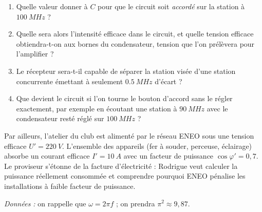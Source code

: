 \documentclass[11pt]{article}
\newcounter{popsec}
\newcounter{popsub}
\newcommand{\courssub}[1]{%
  \stepcounter{popsub}%
  \par\vspace{9pt}\noindent{\popxbold\fontsize{11.5}{13}\selectfont\color{popink}{\color{poporange}\thepopsec.\thepopsub}\hspace{6pt}#1}\par\nopagebreak\vspace{4pt}
}
\begin{document}
\begin{enumerate}
\item Quelle valeur donner à $C$ pour que le circuit soit \emph{accordé} sur la station à $\SI{100}{MHz}$ ?
\item Quelle sera alors l'intensité efficace dans le circuit, et quelle tension efficace obtiendra-t-on aux bornes du condensateur, tension que l'on prélèvera pour l'amplifier ?
\item Le récepteur sera-t-il capable de séparer la station visée d'une station concurrente émettant à seulement $\SI{0,5}{MHz}$ d'écart ?
\item Que devient le circuit si l'on tourne le bouton d'accord sans le régler exactement, par exemple en écoutant une station à $\SI{90}{MHz}$ avec le condensateur resté réglé sur $\SI{100}{MHz}$ ?
\end{enumerate}

Par ailleurs, l'atelier du club est alimenté par le réseau ENEO sous une tension efficace $U' = \SI{220}{V}$. L'ensemble des appareils (fer à souder, perceuse, éclairage) absorbe un courant efficace $I' = \SI{10}{A}$ avec un facteur de puissance $\cos\varphi' = 0,7$. Le proviseur s'étonne de la facture d'électricité : Rodrigue veut calculer la puissance réellement consommée et comprendre pourquoi ENEO pénalise les installations à faible facteur de puissance.

\emph{Données :} on rappelle que $\omega = 2\pi f$ ; on prendra $\pi^2 \approx 9,87$.

\courssub{Consignes}
\end{document}
